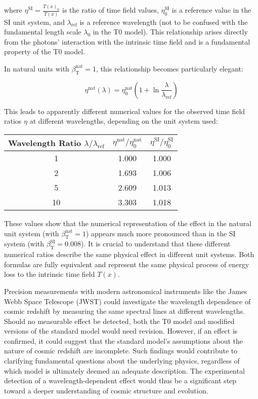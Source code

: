 \documentclass[12pt,a4paper]{article}
\newcommand{\Tfield}{T(x)}
\newcommand{\betaT}{\beta_{\text{T}}}
\begin{document}
	where \(\eta^{\text{SI}} = \frac{\Tfield_0}{\Tfield}\) is the ratio of time field values, \(\eta_0^{\text{SI}}\) is a reference value in the SI unit system, and \(\lambda_{\text{ref}}\) is a reference wavelength (not to be confused with the fundamental length scale \(\lambda_0\) in the T0 model). This relationship arises directly from the photons' interaction with the intrinsic time field and is a fundamental property of the T0 model.
	
	In natural units with \(\betaT^{\text{nat}} = 1\), this relationship becomes particularly elegant:
	
	\begin{equation}
		\eta^{\text{nat}}(\lambda) = \eta_0^{\text{nat}} \left(1 + \ln \frac{\lambda}{\lambda_{\text{ref}}}\right)
	\end{equation}
	
	This leads to apparently different numerical values for the observed time field ratios \(\eta\) at different wavelengths, depending on the unit system used:
	
	\begin{center}
		\begin{tabular}{|c|c|c|}
			\hline
			\textbf{Wavelength Ratio \(\lambda/\lambda_{\text{ref}}\)} & \textbf{\(\eta^{\text{nat}}/\eta_0^{\text{nat}}\)} & \textbf{\(\eta^{\text{SI}}/\eta_0^{\text{SI}}\)} \\
			\hline
			1 & 1.000 & 1.000 \\
			2 & 1.693 & 1.006 \\
			5 & 2.609 & 1.013 \\
			10 & 3.303 & 1.018 \\
			\hline
		\end{tabular}
	\end{center}
	
	These values show that the numerical representation of the effect in the natural unit system (with \(\betaT^{\text{nat}} = 1\)) appears much more pronounced than in the SI system (with \(\betaT^{\text{SI}} = 0.008\)). It is crucial to understand that these different numerical ratios describe the same physical effect in different unit systems. Both formulas are fully equivalent and represent the same physical process of energy loss to the intrinsic time field \(\Tfield\).
	
	Precision measurements with modern astronomical instruments like the James Webb Space Telescope (JWST) could investigate the wavelength dependence of cosmic redshift by measuring the same spectral lines at different wavelengths. Should no measurable effect be detected, both the T0 model and modified versions of the standard model would need revision. However, if an effect is confirmed, it could suggest that the standard model's assumptions about the nature of cosmic redshift are incomplete. Such findings would contribute to clarifying fundamental questions about the underlying physics, regardless of which model is ultimately deemed an adequate description. The experimental detection of a wavelength-dependent effect would thus be a significant step toward a deeper understanding of cosmic structure and evolution.
	
\end{document}
